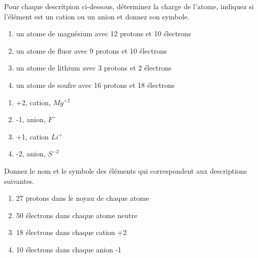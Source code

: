 \documentclass[
  11pt,
  a4paper,
  openany]{book}
\providecommand{\tightlist}{%
  \setlength{\itemsep}{0pt}\setlength{\parskip}{0pt}}
\begin{document}
\begin{Exercise}

Pour chaque descritpion ci-dessous, déterminez la charge de l'atome, indiquez si l'élément est un cation ou un anion et donnez son symbole.

\begin{enumerate}
\def\labelenumi{\arabic{enumi}.}
\tightlist
\item
  un atome de magnésium avec 12 protons et 10 électrons\\
\item
  un atome de fluor avec 9 protons et 10 électrons\\
\item
  un atome de lithium avec 3 protons et 2 électrons\\
\item
  un atome de soufre avec 16 protons et 18 électrons
\end{enumerate}

\end{Exercise}

\begin{Answer}

\begin{enumerate}
\def\labelenumi{\arabic{enumi}.}
\tightlist
\item
  +2, cation, \(Mg^{+2}\)
\item
  -1, anion, \(F^-\)
\item
  +1, cation \(Li^+\)
\item
  -2, anion, \(S^{-2}\)
\end{enumerate}

\end{Answer}

\newpage

\begin{Exercise}

Donnez le nom et le symbole des éléments qui correspondent aux descriptions suivantes.

\begin{enumerate}
\def\labelenumi{\arabic{enumi}.}
\tightlist
\item
  27 protons dans le noyau de chaque atome\\
\item
  50 électrons dans chaque atome neutre\\
\item
  18 électrons dans chaque cation +2\\
\item
  10 électrons dans chaque anion -1
\end{enumerate}

\end{Exercise}
\end{document}
